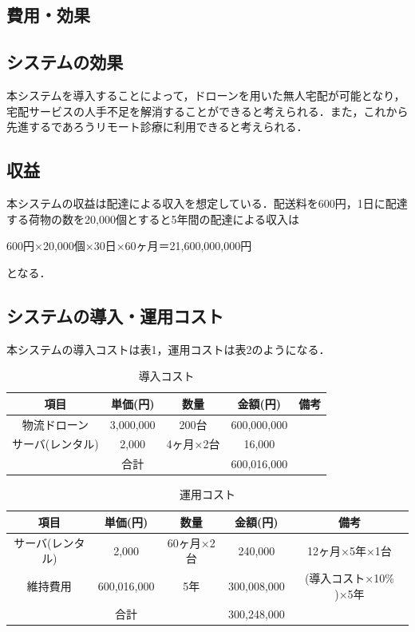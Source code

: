 \documentclass[a4paper, titlepage]{jsarticle}
\begin{document}
\begin{itemize}
\section{費用・効果}
\subsection{システムの効果}
本システムを導入することによって，ドローンを用いた無人宅配が可能となり，宅配サービスの人手不足を解消することができると考えられる．また，これから先進するであろうリモート診療に利用できると考えられる．

\subsection{収益}
本システムの収益は配達による収入を想定している．配送料を600円，1日に配達する荷物の数を20,000個とすると5年間の配達による収入は
\begin{center}
    600円×20,000個×30日×60ヶ月＝21,600,000,000円
\end{center}
となる．

\subsection{システムの導入・運用コスト}
本システムの導入コストは表1，運用コストは表2のようになる．
\begin{table}[htbp]
    \centering
    \begin{tabular}{c c c c c}
    \hline
    項目 & 単価(円) & 数量 & 金額(円) & 備考 \\
    \hline \hline
    物流ドローン & 3,000,000 & 200台 & 600,000,000 &  \\
    サーバ(レンタル) & 2,000 & 4ヶ月×2台 & 16,000 & \\
    \hline \hline
     & 合計 &  & 600,016,000 &  \\
    \hline
    \end{tabular}
    \caption{導入コスト}
    \label{tab:label1}
\end{table}

\begin{table}[htbp]
    \centering
    \begin{tabular}{c c c c c}
    \hline
    項目 & 単価(円) & 数量 & 金額(円) & 備考 \\
    \hline \hline
    サーバ(レンタル) & 2,000 & 60ヶ月×2台 & 240,000 & 12ヶ月×5年×1台 \\
    維持費用 & 600,016,000 & 5年 & 300,008,000 & (導入コスト×10\% )×5年 \\
    \hline \hline
     & 合計 &  & 300,248,000 &  \\
    \hline
    \end{tabular}
    \caption{運用コスト}
    \label{tab:label2}
\end{table}


\end{itemize}
\end{document}
